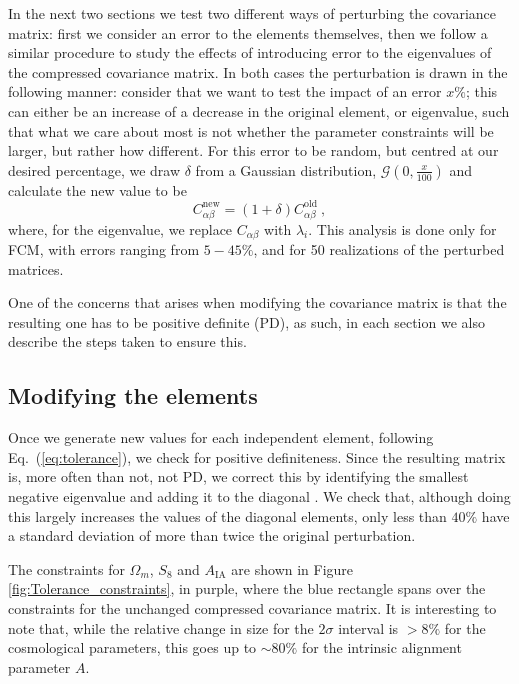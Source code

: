 \documentclass[twocolumn]{\docclass}
\newcommand{\rf}[1]{Figure \ref{fig:#1}}
\newcommand{\ec}[1]{Eq.~(\ref{eq:#1})}
\newcommand\be{\begin{equation}}
\newcommand\ee{\end{equation}}
\newcommand\full{FCM}
\begin{document}
	In the next two sections we test two different ways of perturbing the covariance matrix: first we consider an error to the elements themselves, then we follow a similar procedure to study the effects of introducing error to the eigenvalues of the compressed covariance matrix. In both cases the perturbation is drawn in the following manner: consider that we want to test the impact of an error $x \%$; this can either be an increase of a decrease in the original element, or eigenvalue, such that what we care about most is not whether the parameter constraints will be larger, but rather how different. For this error to be random, but centred at our desired percentage, we draw $\delta$ from a Gaussian distribution, $\mathcal{G}(0,\frac{x}{100})$ and calculate the new value to be
	\be \label{eq:tolerance}
	C_{\alpha \beta}^{\mathrm{new}} = (1 + \delta)C_{\alpha \beta}^{\mathrm{old}}\ 
	,\ee
	where, for the eigenvalue, we replace $C_{\alpha \beta}$ with $\lambda_i$. This analysis is done only for \full, with errors ranging from $5 - 45 \%$, and for 50 realizations of the perturbed matrices.
	
	One of the concerns that arises when modifying the covariance matrix is that the resulting one has to be positive definite (PD), as such, in each section we also describe the steps taken to ensure this.
	
	
	\subsection{Modifying the elements}
	
	Once we generate new values for each independent element, following \ec{tolerance}, we check for positive definiteness. Since the resulting matrix is, more often than not, not PD, we correct this by identifying the smallest negative eigenvalue and adding it to the diagonal \cite{Yuan:2008}. We check that, although doing this largely increases the values of the diagonal elements, only less than $40 \%$ have a standard deviation of more than twice the original perturbation. 
	
	The constraints for $\Omega_m$, $S_8$ and $A_{\mathrm{IA}}$ are shown in \rf{Tolerance_constraints}, in purple, where the blue rectangle spans over the constraints for the unchanged compressed covariance matrix. It is interesting to note that, while the relative change in size for the $2\sigma$ interval is $> 8 \%$ for the cosmological parameters, this goes up to $\sim 80 \%$ for the intrinsic alignment parameter $A$.
	
\end{document}

